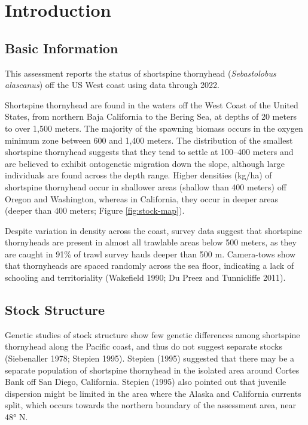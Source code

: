 \documentclass[11pt,
  letterpaper,
]{article}
\begin{document}
\pagebreak
\setlength{\parskip}{5mm plus1mm minus1mm}
\setcounter{page}{1}
\renewcommand{\thefigure}{\arabic{figure}}
\renewcommand{\thetable}{\arabic{table}}
\setcounter{table}{0}
\setcounter{figure}{0}

\hypertarget{introduction}{%
\section{Introduction}\label{introduction}}

\hypertarget{basic-information}{%
\subsection{Basic Information}\label{basic-information}}

This assessment reports the status of shortspine thornyhead (\emph{Sebastolobus alascanus}) off the US West coast using data through 2022.

Shortspine thornyhead are found in the waters off the West Coast of the United States, from northern Baja California to the Bering Sea, at depths of 20 meters to over 1,500 meters. The majority of the spawning biomass occurs in the oxygen minimum zone between 600 and 1,400 meters. The distribution of the smallest shortspine thornyhead suggests that they tend to settle at 100--400 meters and are believed to exhibit ontogenetic migration down the slope, although large individuals are found across the depth range. Higher densities (kg/ha) of shortspine thornyhead occur in shallower areas (shallow than 400 meters) off Oregon and Washington, whereas in California, they occur in deeper areas (deeper than 400 meters; Figure \ref{fig:stock-map}).

Despite variation in density across the coast, survey data suggest that shortspine thornyheads are present in almost all trawlable areas below 500 meters, as they are caught in 91\% of trawl survey hauls deeper than 500 m. Camera-tows show that thornyheads are spaced randomly across the sea floor, indicating a lack of schooling and territoriality (Wakefield 1990; Du Preez and Tunnicliffe 2011).

\hypertarget{stock-structure}{%
\subsection{Stock Structure}\label{stock-structure}}

Genetic studies of stock structure show few genetic differences among shortspine thornyhead along the Pacific coast, and thus do not suggest separate stocks (Siebenaller 1978; Stepien 1995). Stepien (1995) suggested that there may be a separate population of shortspine thornyhead in the isolated area around Cortes Bank off San Diego, California. Stepien (1995) also pointed out that juvenile dispersion might be limited in the area where the Alaska and California currents split, which occurs towards the northern boundary of the assessment area, near 48° N.
\end{document}
